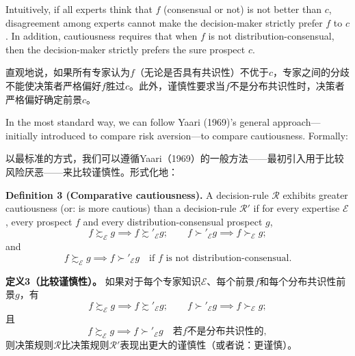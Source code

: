 \documentclass[12pt,a4paper]{article}
\newenvironment{original}
  {\par\noindent\ignorespaces}
  {\par}
\newenvironment{translation}
  {\par\noindent{\color{transblue}\ignorespaces}}
  {\par\medskip}
\begin{document}
\begin{original}
Intuitively, if all experts think that $f$ (consensual or not) is not better than $c$, disagreement among experts cannot make the decision-maker strictly prefer $f$ to $c$. In addition, cautiousness requires that when $f$ is not distribution-consensual, then the decision-maker strictly prefers the sure prospect $c$.
\end{original}

\begin{translation}
直观地说，如果所有专家认为$f$（无论是否具有共识性）不优于$c$，专家之间的分歧不能使决策者严格偏好$f$胜过$c$。此外，谨慎性要求当$f$不是分布共识性时，决策者严格偏好确定前景$c$。
\end{translation}

\begin{original}
In the most standard way, we can follow Yaari (1969)'s general approach---initially introduced to compare risk aversion---to compare cautiousness. Formally:
\end{original}

\begin{translation}
以最标准的方式，我们可以遵循Yaari（1969）的一般方法——最初引入用于比较风险厌恶——来比较谨慎性。形式化地：
\end{translation}

\begin{original}
\textbf{Definition 3 (Comparative cautiousness).} A decision-rule $\mathcal{R}$ exhibits greater cautiousness (or: is more cautious) than a decision-rule $\mathcal{R}'$ if for every expertise $\mathcal{E}$, every prospect $f$ and every distribution-consensual prospect $g$,
\[
f \succsim_{\mathcal{E}} g \implies f \succsim'_{\mathcal{E}} g; \qquad f \succ'_{\mathcal{E}} g \implies f \succ_{\mathcal{E}} g;
\]
and
\[
f \succsim_{\mathcal{E}} g \implies f \succ'_{\mathcal{E}} g \quad \text{if $f$ is not distribution-consensual}.
\]
\end{original}

\begin{translation}
\textbf{定义3（比较谨慎性）。} 如果对于每个专家知识$\mathcal{E}$、每个前景$f$和每个分布共识性前景$g$，有
\[
f \succsim_{\mathcal{E}} g \implies f \succsim'_{\mathcal{E}} g; \qquad f \succ'_{\mathcal{E}} g \implies f \succ_{\mathcal{E}} g;
\]
且
\[
f \succsim_{\mathcal{E}} g \implies f \succ'_{\mathcal{E}} g \quad \text{若$f$不是分布共识性的},
\]
则决策规则$\mathcal{R}$比决策规则$\mathcal{R}'$表现出更大的谨慎性（或者说：更谨慎）。
\end{translation}
\end{document}
